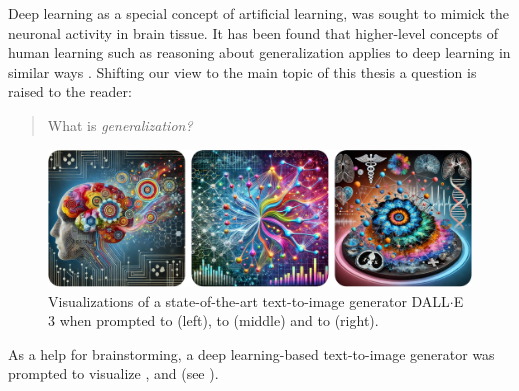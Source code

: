     Deep learning as a special concept of artificial learning, was sought to mimick the neuronal activity in brain tissue. It has been found that higher-level concepts of human learning such as reasoning about generalization applies to deep learning in similar ways \citep{jakel2008generalization}. Shifting our view to the main topic of this thesis a question is raised to the reader:

    \begin{quote}
        \centering \Large
        What is \emph{generalization?}
    \end{quote}

    \begin{figure}
        \includegraphics[width=\textwidth]{sections/01_introduction/figures/synthesized_generalization.pdf}
        \caption{Visualizations of a state-of-the-art text-to-image generator DALL$\cdot$E 3 \citep{betker2023improving} when prompted to  (left), to  (middle) and to  (right).}
        \label{fig:synthesized_generalization}
    \end{figure}

    As a help for brainstorming, a deep learning-based text-to-image generator \citep{betker2023improving} was prompted to visualize ,  and  (see ).

